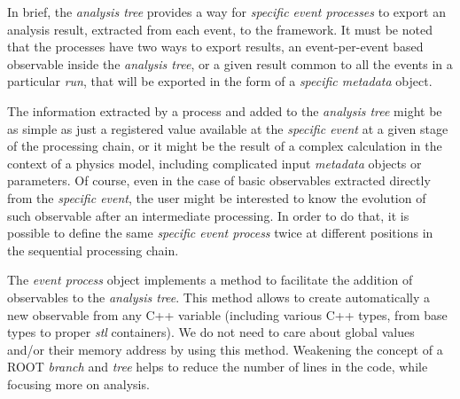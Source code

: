 In brief, the \emph{analysis tree} provides a way for \emph{specific event processes} to export an analysis result, extracted from each event, to the framework. It must be noted that the processes have two ways to export results, an event-per-event based observable inside the \emph{analysis tree}, or a given result common to all the events in a particular \emph{run}, that will be exported in the form of a \emph{specific metadata} object.

The information extracted by a process and added to the \emph{analysis tree} might be as simple as just a registered value available at the \emph{specific event} at a given stage of the processing chain, or it might be the result of a complex calculation in the context of a physics model, including complicated input \emph{metadata} objects or parameters. Of course, even in the case of basic observables extracted directly from the \emph{specific event}, the user might be interested to know the evolution of such observable after an intermediate processing. In order to do that, it is possible to define the same \emph{specific event process} twice at different positions in the sequential processing chain.




The \emph{event process} object implements a method to facilitate the addition of observables to the \emph{analysis tree}. This method allows to create automatically a new observable from any C++ variable (including various C++ types, from base types to proper \emph{stl} containers). We do not need to care about global values and/or their memory address by using this method. Weakening the concept of a ROOT \emph{branch} and \emph{tree} helps to reduce the number of lines in the code, while focusing more on analysis.

